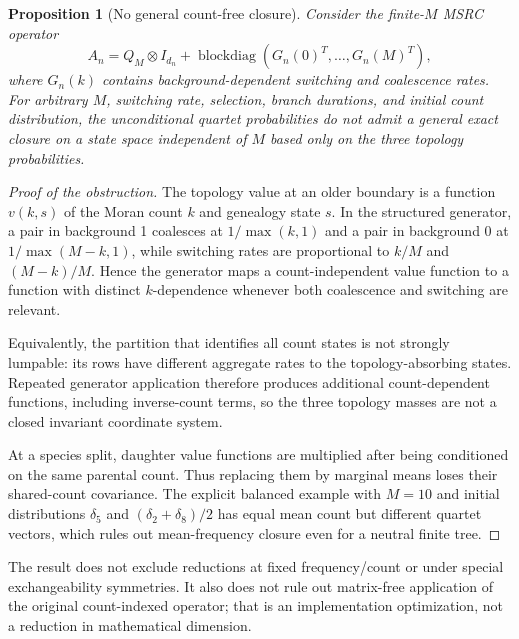 \documentclass[11pt]{article}
\newtheorem{proposition}{Proposition}
\begin{document}
\begin{proposition}[No general count-free closure]
Consider the finite-$M$ MSRC operator
\[
A_n=Q_M\otimes I_{d_n}+
\operatorname{blockdiag}(G_n(0)^T,\ldots,G_n(M)^T),
\]
where $G_n(k)$ contains background-dependent switching and coalescence rates.
For arbitrary $M$, switching rate, selection, branch durations, and initial
count distribution, the unconditional quartet probabilities do not admit a
general exact closure on a state space independent of $M$ based only on the
three topology probabilities.
\end{proposition}

\begin{proof}[Proof of the obstruction]
The topology value at an older boundary is a function $v(k,s)$ of the Moran
count $k$ and genealogy state $s$. In the structured generator, a pair in
background 1 coalesces at $1/\max(k,1)$ and a pair in background 0 at
$1/\max(M-k,1)$, while switching rates are proportional to $k/M$ and
$(M-k)/M$. Hence the generator maps a count-independent value function to a
function with distinct $k$-dependence whenever both coalescence and switching
are relevant.

Equivalently, the partition that identifies all count states is not strongly
lumpable: its rows have different aggregate rates to the topology-absorbing
states. Repeated generator application therefore produces additional
count-dependent functions, including inverse-count terms, so the three
topology masses are not a closed invariant coordinate system.

At a species split, daughter value functions are multiplied after being
conditioned on the same parental count. Thus replacing them by marginal means
loses their shared-count covariance. The explicit balanced example with
$M=10$ and initial distributions $\delta_5$ and
$(\delta_2+\delta_8)/2$ has equal mean count but different quartet vectors,
which rules out mean-frequency closure even for a neutral finite tree.
\end{proof}

The result does not exclude reductions at fixed frequency/count or under
special exchangeability symmetries. It also does not rule out matrix-free
application of the original count-indexed operator; that is an implementation
optimization, not a reduction in mathematical dimension.
\end{document}
